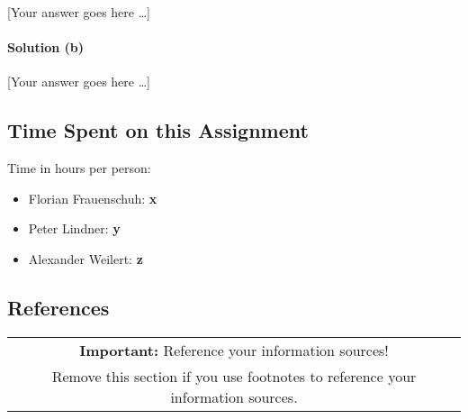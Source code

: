 \documentclass[11pt]{scrartcl}
\newcommand{\youranswerhere}{[Your answer goes here \ldots]}
\begin{document}
\youranswerhere{}

\paragraph{Solution (b)}\mbox{}

\youranswerhere{}

\subsection*{Time Spent on this Assignment}

Time in hours per person:

\begin{itemize}
  \item Florian Frauenschuh: \textbf{x}
  \item Peter Lindner: \textbf{y}
  \item Alexander Weilert: \textbf{z}
\end{itemize}

\subsection*{References}

\begin{table}[H]
  \centering
  \begin{tabular}{c}
    \hline
    \textbf{Important:} Reference your information sources! \tabularnewline
    Remove this section if you use footnotes to reference your information sources. \tabularnewline
    \hline
  \end{tabular}
\end{table}
\end{document}
